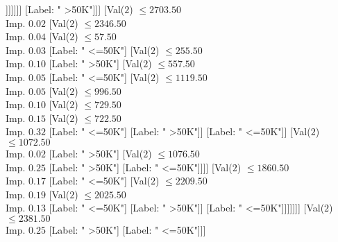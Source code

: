 \documentclass[margin=10pt]{standalone}
\begin{document}
\begin{forest}
											[Val($2$) $ \leq 18245.50$ \\ Imp. $0.51$
												[Label: " >50K"]
												[Val($2$) $ \leq 18304.50$ \\ Imp. $0.16$
													[Label: " <=50K"]
													[Val($2$) $ \leq 18327.50$ \\ Imp. $0.31$
														[Label: " >50K"]
														[Val($2$) $ \leq 18344.50$ \\ Imp. $0.19$
															[Label: " <=50K"]
															[Val($2$) $ \leq 18350.50$ \\ Imp. $0.92$
																[Label: " >50K"]
																[Label: " <=50K"]]]]]]]
										[Label: " >50K"]]]
								[Val($2$) $ \leq 2703.50$ \\ Imp. $0.02$
									[Val($2$) $ \leq 2346.50$ \\ Imp. $0.04$
										[Val($2$) $ \leq 57.50$ \\ Imp. $0.03$
											[Label: " <=50K"]
											[Val($2$) $ \leq 255.50$ \\ Imp. $0.10$
												[Label: " >50K"]
												[Val($2$) $ \leq 557.50$ \\ Imp. $0.05$
													[Label: " <=50K"]
													[Val($2$) $ \leq 1119.50$ \\ Imp. $0.05$
														[Val($2$) $ \leq 996.50$ \\ Imp. $0.10$
															[Val($2$) $ \leq 729.50$ \\ Imp. $0.15$
																[Val($2$) $ \leq 722.50$ \\ Imp. $0.32$
																	[Label: " <=50K"]
																	[Label: " >50K"]]
																[Label: " <=50K"]]
															[Val($2$) $ \leq 1072.50$ \\ Imp. $0.02$
																[Label: " >50K"]
																[Val($2$) $ \leq 1076.50$ \\ Imp. $0.25$
																	[Label: " >50K"]
																	[Label: " <=50K"]]]]
														[Val($2$) $ \leq 1860.50$ \\ Imp. $0.17$
															[Label: " <=50K"]
															[Val($2$) $ \leq 2209.50$ \\ Imp. $0.19$
																[Val($2$) $ \leq 2025.50$ \\ Imp. $0.13$
																	[Label: " <=50K"]
																	[Label: " >50K"]]
																[Label: " <=50K"]]]]]]]
										[Val($2$) $ \leq 2381.50$ \\ Imp. $0.25$
											[Label: " >50K"]
											[Label: " <=50K"]]]

\end{forest}
\end{document}
